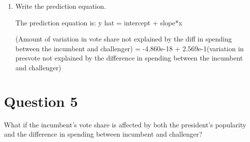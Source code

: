 \documentclass[12pt,letterpaper]{article}
\begin{document}
\begin{enumerate}
		 	\vspace{2cm}
		\item Write the prediction equation.
		
The prediction equation is:
y hat = intercept + slope*x

(Amount of variation in vote share not explained by the diff in spending between the incumbent and challenger) = -4.860e-18 + 2.569e-1(variation in presvote not explained by the difference in spending between the incumbent and challenger)		

	\end{enumerate}
	
	\newpage	

\section*{Question 5}
\noindent What if the incumbent's vote share is affected by both the president's popularity and the difference in spending between incumbent and challenger? 
\end{document}
